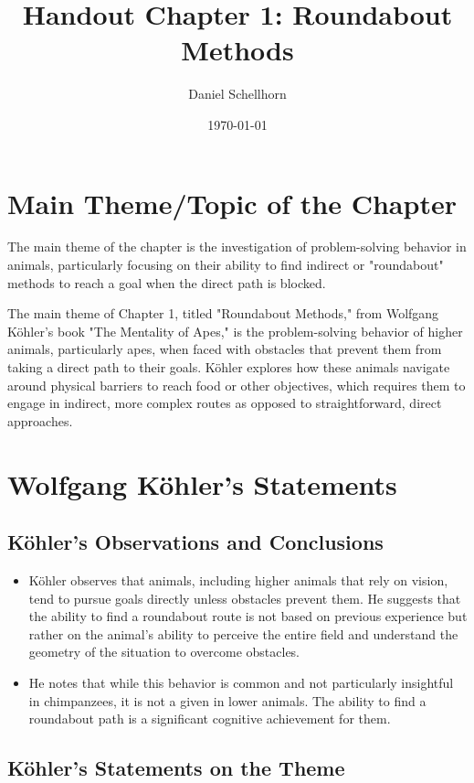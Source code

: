 \documentclass{article}
\title{Handout Chapter 1: Roundabout Methods}
\author{Daniel Schellhorn}
\date{\today}
\begin{document}
\maketitle

\section{Main Theme/Topic of the Chapter}

The main theme of the chapter is the investigation of problem-solving behavior in animals, particularly focusing on their ability to find indirect or "roundabout" methods to reach a goal when the direct path is blocked.

The main theme of Chapter 1, titled "Roundabout Methods," from Wolfgang Köhler's book "The Mentality of Apes," is the problem-solving behavior of higher animals, particularly apes, when faced with obstacles that prevent them from taking a direct path to their goals. Köhler explores how these animals navigate around physical barriers to reach food or other objectives, which requires them to engage in indirect, more complex routes as opposed to straightforward, direct approaches.

\section{Wolfgang Köhler's Statements}

\subsection{Köhler's Observations and Conclusions}

\begin{itemize}
    \item Köhler observes that animals, including higher animals that rely on vision, tend to pursue goals directly unless obstacles prevent them. He suggests that the ability to find a roundabout route is not based on previous experience but rather on the animal's ability to perceive the entire field and understand the geometry of the situation to overcome obstacles.
    \item He notes that while this behavior is common and not particularly insightful in chimpanzees, it is not a given in lower animals. The ability to find a roundabout path is a significant cognitive achievement for them.
\end{itemize}

\subsection{Köhler's Statements on the Theme}
\end{document}
